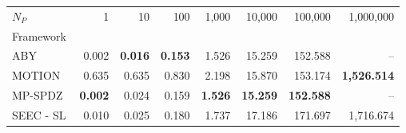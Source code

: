 \begin{tabular}{lrrrrrrr}
\toprule
$N_P$ & 1 & 10 & 100 & 1,000 & 10,000 & 100,000 & 1,000,000 \\
Framework &  &  &  &  &  &  &  \\
\midrule
ABY~\cite{DSZ15} & 0.002 & \bfseries 0.016 & \bfseries 0.153 & 1.526 & 15.259 & 152.588 & -- \\
MOTION~\cite{BDST22} & 0.635 & 0.635 & 0.830 & 2.198 & 15.870 & 153.174 & \bfseries 1,526.514 \\
MP-SPDZ~\cite{CCS:Keller20} & \bfseries 0.002 & 0.024 & 0.159 & \bfseries 1.526 & \bfseries 15.259 & \bfseries 152.588 & -- \\
SEEC - SL & 0.010 & 0.025 & 0.180 & 1.737 & 17.186 & 171.697 & 1,716.674 \\
\bottomrule
\end{tabular}

